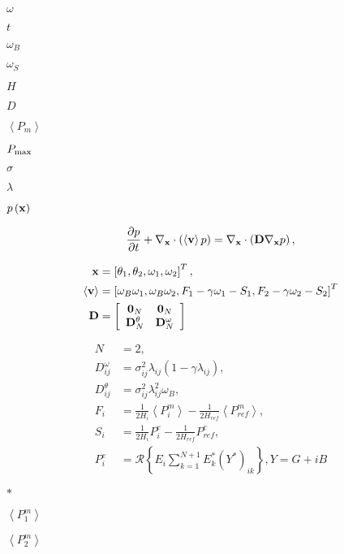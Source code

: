 \documentclass{article}
\begin{document}
$\omega$
\pagebreak

$t$
\pagebreak

$\omega_B$
\pagebreak

$\omega_S$
\pagebreak

$H$
\pagebreak

$D$
\pagebreak

$\left<P_m\right>$
\pagebreak

$P_{\rm max}$
\pagebreak

$\sigma$
\pagebreak

$\lambda$
\pagebreak

$p\left({\bf x}\right)$
\pagebreak

\begin{equation} \frac{\partial p}{\partial t} + \nabla_{\bf x} \cdot \left(\left<{\bf v}\right> p\right) = \nabla_{\bf x} \cdot \left( {\bf D} \nabla_{\bf x} p \right), \end{equation}
\pagebreak

\begin{align} {\bf x} &= \left[ \theta_1, \theta_2, \omega_1, \omega_2 \right]^T, \\ \left<{\bf v}\right> &= \left[ \omega_B\omega_1, \omega_B\omega_2, F_1-\gamma\omega_1-S_1, F_2-\gamma\omega_2-S_2 \right]^T \\ {\bf D} &= \left[ \begin{array}{cc} {\bf 0}_N & {\bf 0}_N \\ {\bf D}^\theta_N & {\bf D}^\omega_N \end{array} \right] \end{align}
\pagebreak

\begin{align} N&=2,\\ D_{ij}^\omega &= \sigma_{ij}^2\lambda_{ij}\left(1-\gamma\lambda_{ij}\right), \\ D_{ij}^\theta &= \sigma_{ij}^2\lambda_{ij}^2\omega_B, \\ F_i &= \frac{1}{2H_i} \left<P^m_i\right> - \frac{1}{2H_{ref}}\left<P_{ref}^m\right>, \\ S_i &= \frac{1}{2H_i} P^e_i - \frac{1}{2H_{ref}} P_{ref}^e, \\ P_i^e &= \mathcal{R}\left\{ E_i \sum_{k=1}^{N+1} E_k^* \left( Y^* \right)_{ik} \right\}, Y = G+iB \end{align}
\pagebreak

$*$
\pagebreak

$\left< P^m_1\right>$
\pagebreak

$\left< P^m_2\right>$
\pagebreak
\end{document}
